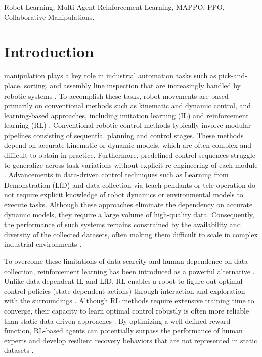 \documentclass[lettersize,journal]{IEEEtran}
\begin{document}
\begin{IEEEkeywords}
Robot Learning, Multi Agent Reinforcement Learning, MAPPO, PPO, Collaborative Manipulations.
\end{IEEEkeywords}

\section{Introduction}
\label{intro}
 manipulation plays a key role in industrial automation tasks such as pick-and-place, sorting, and assembly line inspection that are increasingly handled by robotic systems \cite{intro-2}. To accomplish these tasks, robot movements are based primarily on conventional methods such as kinematic and dynamic control, and learning-based approaches, including imitation learning (IL) and reinforcement learning (RL) \cite{intro-3}. Conventional robotic control methods typically involve modular pipelines consisting of sequential planning and control stages. These methods depend on accurate kinematic or dynamic models, which are often complex and difficult to obtain in practice. Furthermore, predefined control sequences struggle to generalize across task variations without explicit re-engineering of each module \cite{intro-1}. Advancements in data-driven control techniques such as Learning from Demonstration (LfD) \cite{intro-4} and data collection via teach pendants or tele-operation \cite{intro-5} do not require explicit knowledge of robot dynamics or environmental models to execute tasks. Although these approaches eliminate the dependency on accurate dynamic models, they require a large volume of high-quality data. Consequently, the performance of such systems remains constrained by the availability and diversity of the collected datasets, often making them difficult to scale in complex industrial environments \cite{intro-6}.

To overcome these limitations of data scarcity and human dependence on data collection, reinforcement learning has been introduced as a powerful alternative \cite{intro-8}. Unlike data dependent IL and LfD, RL enables a robot to figure out optimal control policies (state dependent actions) through interaction and exploration with the surroundings \cite{intro-7}. Although RL methods require extensive training time to converge, their capacity to learn optimal control robustly is often more reliable than static data-driven approaches \cite{intro-10}. By optimizing a well-defined reward function, RL-based agents can potentially surpass the performance of human experts and develop resilient recovery behaviors that are not represented in static datasets \cite{intro-9}.
\end{document}
